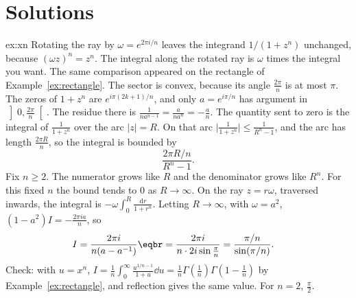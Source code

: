 \section{Solutions}

\begin{solution}{ex:xn}
\idea Rotating the ray by $\omega=e^{2\pi i/n}$ leaves the integrand $1/(1+z^n)$ unchanged, because $(\omega z)^n=z^n$. The integral along the rotated ray is $\omega$ times the integral you want. The same comparison appeared on the rectangle of Example~\ref{ex:rectangle}.
\writeup The sector is convex, because its angle $\frac{2\pi}n$ is at most $\pi$. The zeros of $1+z^n$ are $e^{i\pi(2k+1)/n}$, and only $a=e^{i\pi/n}$ has argument in
$\left]0,\frac{2\pi}n\right[$. The residue there is $\frac1{na^{n-1}}=\frac a{na^n}=-\frac an$. The quantity sent to zero is the integral of $\frac1{1+z^n}$ over the arc $|z|=R$. On that arc $\bigl|\frac1{1+z^n}\bigr|\le\frac1{R^n-1}$, and the arc has length $\frac{2\pi R}n$, so the integral is bounded by
\[
\frac{2\pi R/n}{R^n-1}.
\]
Fix $n\ge2$. The numerator grows like $R$ and the denominator grows like $R^n$. For this fixed $n$ the bound tends to $0$ as $R\to\infty$. On the ray $z=r\omega$, traversed inwards, the integral is $-\omega\int_0^R\frac{\mathrm dr}{1+r^n}$. Letting $R\to\infty$, with $\omega=a^2$,
$(1-a^2)I=-\frac{2\pi ia}n$, so
\[
\begin{aligned}I&=\frac{2\pi i}{n(a-a^{-1})}\eqbr=\frac{2\pi i}{n\cdot2i\sin\frac\pi n}=\frac{\pi/n}{\sin(\pi/n)}.\end{aligned}
\]
Check: with $u=x^n$, $I=\frac1n\int_0^\infty\frac{u^{1/n-1}}{1+u}\dd u=\frac1n\Gamma(\frac1n)\Gamma(1-\frac1n)$ by Example~\ref{ex:rectangle}, and reflection gives the same value. For $n=2$, $\frac\pi2$.
\end{solution}

